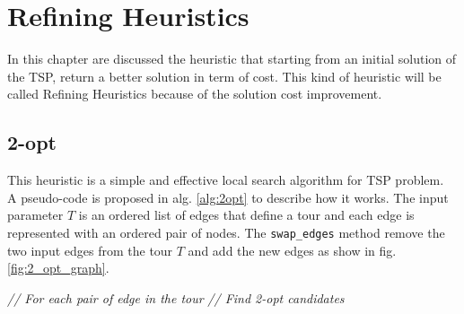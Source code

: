\chapter{Refining Heuristics}
\label{chapter:refining}
In this chapter are discussed the heuristic that starting from an initial solution of the TSP, return a better solution in term of cost. This kind of heuristic will be called Refining Heuristics because of the solution cost improvement. 

\section{2-opt} \label{sec:best_2_opt}

This heuristic is a simple and effective local search algorithm for TSP problem.\\
A pseudo-code is proposed in alg. \ref{alg:2opt} to describe how it works. The input parameter $ T $ is an ordered list of edges that define a tour and each edge is represented with an ordered pair of nodes. The \texttt{swap\_edges} method remove the two input edges from the tour $ T $ and add the new edges as show in fig. \ref{fig:2_opt_graph}.

\begin{algorithm}
	\caption{}\label{alg:2opt}
	\begin{algorithmic}[1]
			 \textit{ // For each pair of edge in the tour}
				\EndIf
				 \textit{ // Find 2-opt candidates}
				\EndIf
			\EndFor
		\EndFor
	\EndProcedure
	\end{algorithmic}
\end{algorithm}

